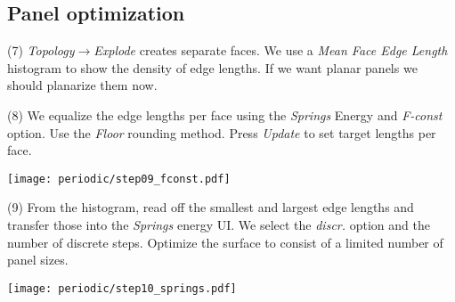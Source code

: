 \documentclass[Thesis.tex]{subfiles}
\begin{document}
\subsection{Panel optimization}

\begin{compactenum}[(1)]
\item[(7)] \emph{Topology$\to$Explode} creates separate faces. We use a \emph{Mean Face Edge Length} histogram to show the density of edge lengths. If we want planar panels we should planarize them now.

\begin{center}
\begin{minipage}{\linewidth}
            \centering
\end{minipage}
\end{center}

\item[(8)] We equalize the edge lengths per face using the \emph{Springs} Energy and \emph{F-const} option. Use the \emph{Floor} rounding method. Press \emph{Update} to set target lengths per face.

\begin{center}
\begin{minipage}{0.7\linewidth}
            \centering
\end{minipage}
\begin{minipage}{0.29\linewidth}
\texttt{[image: periodic/step09\_fconst.pdf]}
\end{minipage}
\end{center}
\item[(9)] From the histogram, read off the smallest and largest edge lengths and transfer those into the \emph{Springs} energy UI. We select the \emph{discr.} option and the number of discrete steps. Optimize the surface to consist of a limited number of panel sizes.

\begin{center}
\begin{minipage}{0.7\linewidth}
            \centering
\end{minipage}
\begin{minipage}{0.29\linewidth}
\texttt{[image: periodic/step10\_springs.pdf]}
\end{minipage}
\end{center}            
\end{compactenum}
\end{document}
